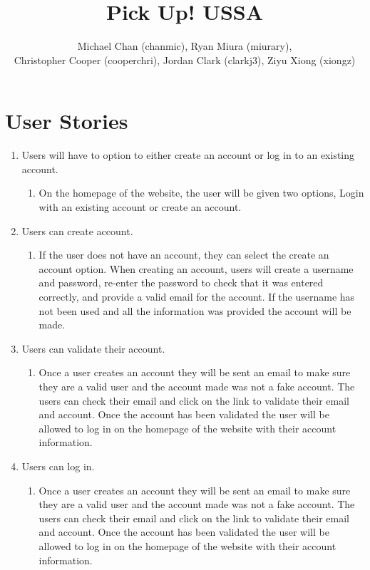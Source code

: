 \documentclass[a4paper]{article}
\title{Pick Up! USSA}
\author{Michael Chan (chanmic), Ryan Miura (miurary), \\Christopher Cooper (cooperchri), Jordan Clark (clarkj3), Ziyu Xiong (xiongz)}
\begin{document}
\maketitle

\section{User Stories}
\begin{enumerate}

\item Users will have to option to either create an account or log in to an existing account.
\begin{enumerate}
\item On the homepage of the website, the user will be given two options, Login with an existing account or create an account.
\end{enumerate}

\item Users can create account.
\begin{enumerate}

\item If the user does not have an account, they can select the create an account option. When creating an account, users will create a username and password, re-enter the password to check that it was entered correctly, and provide a valid email for the account. If the username has not been used and all the information was provided the account will be made.
\end{enumerate}

\item Users can validate their account.
\begin{enumerate}
\item Once a user creates an account they will be sent an email to make sure they are a valid user and the account made was not a fake account. The users can check their email and click on the link to validate their email and account. Once the account has been validated the user will be allowed to log in on the homepage of the website with their account information.
\end{enumerate}

\item Users can log in.
\begin{enumerate}
\item Once a user creates an account they will be sent an email to make sure they are a valid user and the account made was not a fake account. The users can check their email and click on the link to validate their email and account. Once the account has been validated the user will be allowed to log in on the homepage of the website with their account information.
\end{enumerate}


\end{enumerate}
\end{document}
